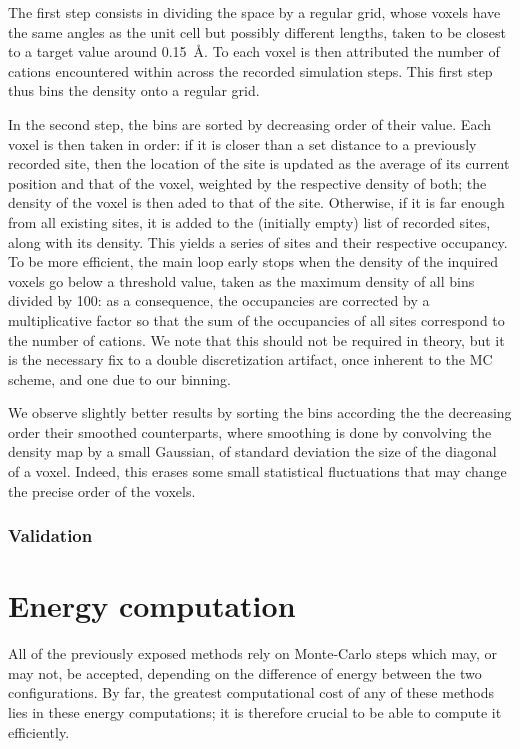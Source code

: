 \documentclass[main.tex]{subfiles}
\begin{document}
The first step consists in dividing the space by a regular grid, whose voxels have the same angles as the unit cell but possibly different lengths, taken to be closest to a target value around \qty{0.15}{\angstrom}. To each voxel is then attributed the number of cations encountered within across the recorded simulation steps. This first step thus bins the density onto a regular grid.

In the second step, the bins are sorted by decreasing order of their value. Each voxel is then taken in order: if it is closer than a set distance to a previously recorded site, then the location of the site is updated as the average of its current position and that of the voxel, weighted by the respective density of both; the density of the voxel is then aded to that of the site. Otherwise, if it is far enough from all existing sites, it is added to the (initially empty) list of recorded sites, along with its density. This yields a series of sites and their respective occupancy. To be more efficient, the main loop early stops when the density of the inquired voxels go below a threshold value, taken as the maximum density of all bins divided by 100: as a consequence, the occupancies are corrected by a multiplicative factor so that the sum of the occupancies of all sites correspond to the number of cations. We note that this should not be required in theory, but it is the necessary fix to a double discretization artifact, once inherent to the MC scheme, and one due to our binning.

We observe slightly better results by sorting the bins according the the decreasing order their smoothed counterparts, where smoothing is done by convolving the density map by a small Gaussian, of standard deviation the size of the diagonal of a voxel. Indeed, this erases some small statistical fluctuations that may change the precise order of the voxels.

\subsubsection{Validation}

\section{Energy computation}\label{energy_computation}

All of the previously exposed methods rely on Monte-Carlo steps which may, or may not, be accepted, depending on the difference of energy between the two configurations. By far, the greatest computational cost of any of these methods lies in these energy computations; it is therefore crucial to be able to compute it efficiently.
\end{document}
